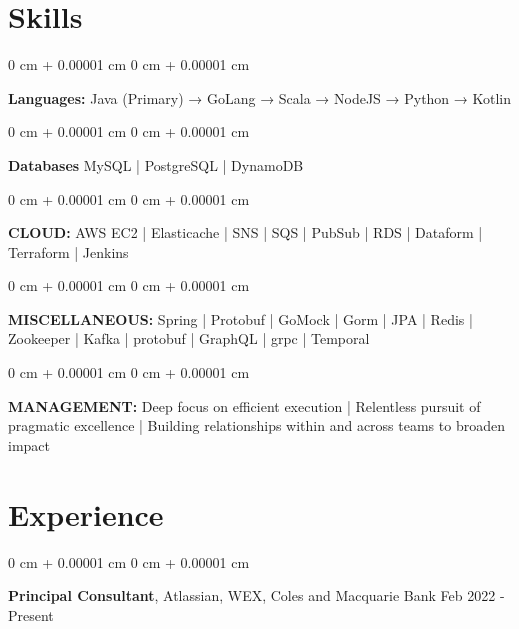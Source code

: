 \documentclass[10pt, letterpaper]{article}
\newenvironment{onecolentry}{
    \begin{adjustwidth}{
        0 cm + 0.00001 cm
    }{
        0 cm + 0.00001 cm
    }
}{
    \end{adjustwidth}
} %
\newenvironment{twocolentry}[2][]{
    \onecolentry
    \def\secondColumn{#2}
    \setcolumnwidth{\fill, 4.5 cm}
    \begin{paracol}{2}
}{
    \switchcolumn \raggedleft \secondColumn
    \end{paracol}
    \endonecolentry
} %
\begin{document}
    \section{Skills}
        \vspace{0.1cm} %
        \begin{onecolentry}
            \textbf{Languages:} Java (Primary) → GoLang → Scala → NodeJS → Python → Kotlin
        \end{onecolentry}
        \vspace{0.15cm} %
        \begin{onecolentry}
            \textbf{Databases} MySQL | PostgreSQL | DynamoDB
        \end{onecolentry}
        \vspace{0.15cm} %
        \begin{onecolentry}
            \textbf{CLOUD:} AWS EC2 | Elasticache | SNS | SQS | PubSub | RDS | Dataform | Terraform | Jenkins
        \end{onecolentry}
        \vspace{0.15cm} %
        \begin{onecolentry}
            \textbf{MISCELLANEOUS:} Spring | Protobuf | GoMock | Gorm | JPA | Redis | Zookeeper | Kafka | protobuf | GraphQL | grpc | Temporal
        \end{onecolentry}
        \vspace{0.15cm} %
        \begin{onecolentry}
            \textbf{MANAGEMENT:} Deep focus on efficient execution | Relentless pursuit of pragmatic excellence | Building relationships within and across teams to broaden impact
        \end{onecolentry}
    
    \vspace{0.3cm} %
    
    \section{Experience}
        \vspace{0.25 cm} %
        \begin{twocolentry}{
            Feb 2022 - Present
        }
        \textbf{Principal Consultant}, Atlassian, WEX, Coles and Macquarie Bank\end{twocolentry}
\end{document}
